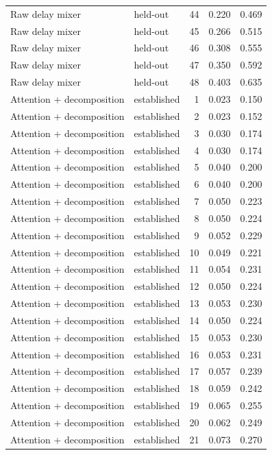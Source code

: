 \begin{tabular}{llrrr}
Raw delay mixer & held-out & 44 & 0.220 & 0.469 \\
Raw delay mixer & held-out & 45 & 0.266 & 0.515 \\
Raw delay mixer & held-out & 46 & 0.308 & 0.555 \\
Raw delay mixer & held-out & 47 & 0.350 & 0.592 \\
Raw delay mixer & held-out & 48 & 0.403 & 0.635 \\
Attention + decomposition & established & 1 & 0.023 & 0.150 \\
Attention + decomposition & established & 2 & 0.023 & 0.152 \\
Attention + decomposition & established & 3 & 0.030 & 0.174 \\
Attention + decomposition & established & 4 & 0.030 & 0.174 \\
Attention + decomposition & established & 5 & 0.040 & 0.200 \\
Attention + decomposition & established & 6 & 0.040 & 0.200 \\
Attention + decomposition & established & 7 & 0.050 & 0.223 \\
Attention + decomposition & established & 8 & 0.050 & 0.224 \\
Attention + decomposition & established & 9 & 0.052 & 0.229 \\
Attention + decomposition & established & 10 & 0.049 & 0.221 \\
Attention + decomposition & established & 11 & 0.054 & 0.231 \\
Attention + decomposition & established & 12 & 0.050 & 0.224 \\
Attention + decomposition & established & 13 & 0.053 & 0.230 \\
Attention + decomposition & established & 14 & 0.050 & 0.224 \\
Attention + decomposition & established & 15 & 0.053 & 0.230 \\
Attention + decomposition & established & 16 & 0.053 & 0.231 \\
Attention + decomposition & established & 17 & 0.057 & 0.239 \\
Attention + decomposition & established & 18 & 0.059 & 0.242 \\
Attention + decomposition & established & 19 & 0.065 & 0.255 \\
Attention + decomposition & established & 20 & 0.062 & 0.249 \\
Attention + decomposition & established & 21 & 0.073 & 0.270 \\

\end{tabular}
